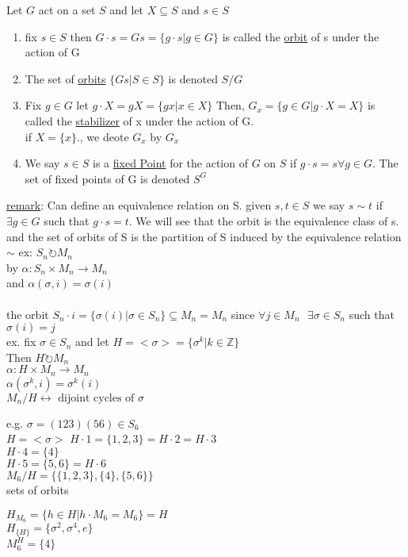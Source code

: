 \documentclass{article}
\begin{document}
\begin{definition}
    Let $G$ act on a set $S$ and let $X \subseteq S$ and $s \in S$ \begin{enumerate}
        \item fix $s \in S$ then $G \cdot s  = Gs = \{g\cdot s | g\in G\}$ is called the \underline{orbit} of s under the action of G 
        \item The set of \underline{orbits} $\{Gs | S \in S\}$ is denoted $S / G $
        \item Fix $g \in G$ let $g\cdot X = g X = \{gx | x \in X\}$ Then, $G_x = \{g \in G | g \cdot X = X\}$ is called the \underline{stabilizer} of x under the action of G. \\ if $X = \{x\}$., we deote $G_x$ by $G_x$
        \item We say $s\in S$ is a \underline{fixed Point} for the action of $G$ on $S$ if $g\cdot s = s \forall g \in G.$ The set of fixed points of G is denoted $S^G$
    \end{enumerate} 
\end{definition}
\underline{remark}: Can define an equivalence relation on S. given $s, t \in S$ we say $s \sim t$ if $\exists g \in G$ such that $g\cdot s = t$. We will see that the orbit is the equivalence class of s. and the set of orbits of S is the partition of S induced by the equivalence relation $\sim$
ex: $S_n \circlearrowright M_n$ \\ by $\alpha: S_n \times M_n \to M_n$ \\ and $\alpha(\sigma, i) = \sigma(i)$ \\
\\ 
the orbit 
$S_n \cdot i = \{\sigma(i) | \sigma \in S_n \} \subseteq M_n = M_n$ since $\forall j \in M_n \text{ }\exists \sigma \in S_n$ such that $\sigma(i) = j$ \\

 ex. fix $\sigma \in S_n$ and let $H = <\sigma> = \{\sigma^k | k \in \mathbb{Z}\}$  \\ 
 Then $H \circlearrowright M_n$ 
 \\ 
 $\alpha: H \times M_n \to M_n$ \\
    $\alpha(\sigma^k, i) = \sigma^k(i)$ \\
    $M_n / H \leftrightarrow \text{ dijoint cycles of } \sigma$ 

e.g. $\sigma = (123)(56) \in S_6$ \\ 
$H = <\sigma> $
$H \cdot 1 = \{1, 2, 3\} = H \cdot 2 = H \cdot 3$ 
\\ 
$H \cdot 4 = \{4\} $\\
$H \cdot 5 = \{5, 6\} = H\cdot6$ \\ 

$M_6 / H = \{\{1,2,3\}, \{4\}, \{5, 6\}\}$ \\ sets of orbits 

$H_{M_6} = \{h \in H | h\cdot M_6 = M_6\} = H$ \\ 
$H_{\{H\}} = \{\sigma^2, \sigma^4, e\}$
\\ 
$M_6^H = \{4\}$ 
\end{document}
